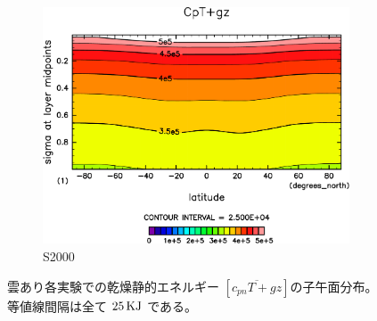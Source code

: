 \documentclass[body]{subfiles}
\begin{document}
\begin{figure}[t]
\begin{subfigure}{.4\textwidth}
		\includegraphics[width=\textwidth]{S2000/CpT+gz,time=7300:7665-crop-rotate.pdf}
		\caption{S2000}\label{CpT+gzS2000}
	\end{subfigure}
	\caption[雲あり各実験での乾燥静的エネルギーの子午面分布]{
		雲あり各実験での乾燥静的エネルギー \([\overline{c_{pn}T+gz}]\)の子午面分布。
		等値線間隔は全て \(25\hmu{KJ}\) である。
	}\label{Cp+gz}
\end{figure}
\end{document}
